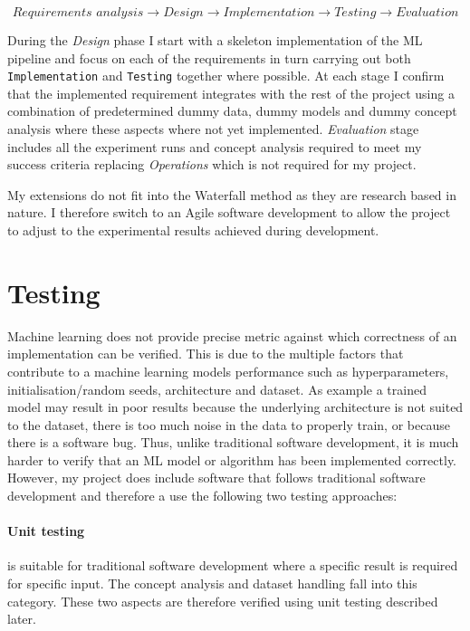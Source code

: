 \begin{equation*}
    \textit{Requirements analysis} \longrightarrow \textit{Design} \longrightarrow \textit{Implementation} \longrightarrow \textit{Testing} \longrightarrow \textit{Evaluation}
\end{equation*}

During the \textit{Design} phase I start with a skeleton implementation of the ML pipeline and focus on each of the requirements in turn carrying out both \texttt{Implementation} and \texttt{Testing} together where possible.
At each stage I confirm that the implemented requirement integrates with the rest of the project using a combination of predetermined dummy data, dummy models and dummy concept analysis where these aspects where not yet implemented.
\textit{Evaluation} stage includes all the experiment runs and concept analysis required to meet my success criteria replacing \textit{Operations} which is not required for my project.

My extensions do not fit into the Waterfall method as they are research based in nature. I therefore switch to an Agile software development  to allow the project to adjust to the experimental results achieved during development.

\section{Testing}


Machine learning does not provide precise metric against which correctness of an implementation can be verified.
This is due to the multiple factors that contribute to a machine learning models performance such as hyperparameters, initialisation/random seeds, architecture and dataset.
As example a trained model may result in poor results because the underlying architecture is not suited to the dataset, there is too much noise in the data to properly train, or because there is a software bug.
Thus, unlike traditional software development, it is much harder to verify that an ML model or algorithm has been implemented correctly.
However, my project does include software that follows traditional software development and therefore a use the following two testing approaches:

\paragraph{Unit testing}
is suitable for traditional software development where a specific result is required for specific input.
The concept analysis and dataset handling fall into this category.
These two aspects are therefore verified using unit testing described later. 

